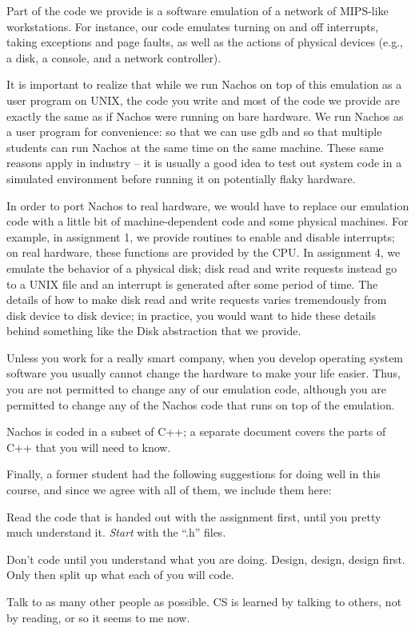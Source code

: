 Part of the code we provide is a software emulation of a network 
of MIPS-like workstations.  For instance, our code emulates turning on 
and off interrupts, taking exceptions and page faults, as well as 
the actions of physical devices (e.g., a disk, a console, and a
network controller).

It is important to realize that while we run Nachos on top of this
emulation as a user program on UNIX, the code you write and most of the code
we provide are exactly the same as if Nachos were running on bare hardware.
We run Nachos as a user program for convenience: so
that we can use gdb and so that multiple students can run Nachos
at the same time on the same machine.  These same reasons apply
in industry -- it is usually a good idea to test out system code
in a simulated environment before running it on potentially flaky hardware.

In order to port Nachos to real hardware, we would have to
replace our emulation code with a little bit of machine-dependent code and
some physical machines.  For example, in assignment 1, we provide
routines to enable and disable interrupts; on real hardware,
these functions are provided by the CPU.
In assignment 4, we emulate the behavior of a physical disk;
disk read and write requests instead go to a UNIX file and an 
interrupt is generated after some period of time.
The details of how to make disk read and write requests varies tremendously
from disk device to disk device; in practice, you would want to hide
these details behind something like the Disk abstraction that we provide.

Unless you work for a really smart company, when you develop
operating system software you usually cannot change the hardware to 
make your life easier.  Thus, you are not permitted to change any of
our emulation code, although you are permitted to change any of
the Nachos code that runs on top of the emulation.

Nachos is coded in a subset of C++; a separate document covers the 
parts of C++ that you will need to know.  

Finally, a former student had the following suggestions for doing well in this
course, and since we agree with all of them, we include them here:

\begin{description}

\item Read the code that is handed out with the assignment first, until 
you pretty much understand it.  {\em Start} with the ``.h'' files.

\item Don't code until you understand what you are doing.  Design, 
design, design first.  Only then split up what each of you will code.

\item Talk to as many other people as possible.  CS is learned by talking 
to others, not by reading, or so it seems to me now.

\end{description}

